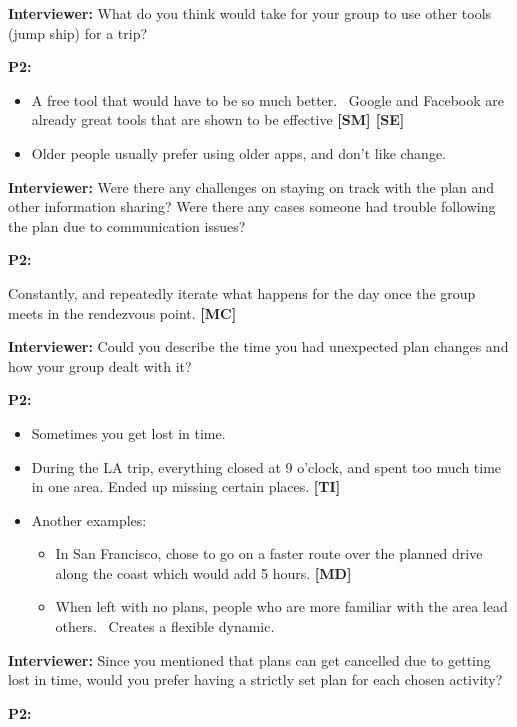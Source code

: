 \documentclass[12pt,a4paper]{article}
\begin{document}
\textbf{Interviewer: }What do you think would take for your group to use other tools (jump ship) for a trip? 

\textbf{P2:}

\begin{itemize}
    \item A free tool that would have to be so much better. 
Google and Facebook are already great tools that are shown to be effective \textbf{[SM] [SE]}

    \item Older people usually prefer using older apps, and don’t like change. 
\end{itemize}

\textbf{Interviewer: }Were there any challenges on staying on track with the plan and other information sharing? Were there any cases someone had trouble following the plan due to communication issues?  

\textbf{P2: }

Constantly, and repeatedly iterate what happens for the day once the group meets in the rendezvous point. \textbf{[MC]}

\textbf{Interviewer: }Could you describe the time you had unexpected plan changes and how your group dealt with it? 

\textbf{P2:}

\begin{itemize}
    \item Sometimes you get lost in time. 
    \item During the LA trip, everything closed at 9 o’clock, and spent too much time in one area. Ended up missing certain places. \textbf{[TI]}
    \item Another examples: 
    \begin{itemize}
        \item In San Francisco, chose to go on a faster route over the planned drive along the coast which would add 5 hours. \textbf{[MD]}
        \item When left with no plans, people who are more familiar with the area lead others. 
Creates a flexible dynamic. 

    \end{itemize}
\end{itemize}

\textbf{Interviewer: }Since you mentioned that plans can get cancelled due to getting lost in time, would you prefer having a strictly set plan for each chosen activity? 

\textbf{P2: }
\end{document}
